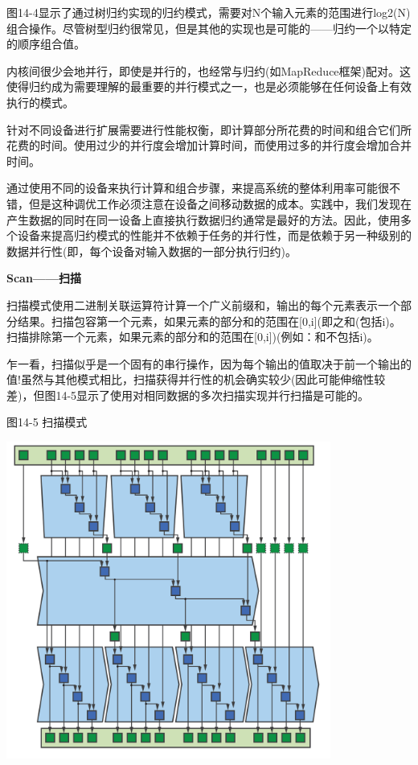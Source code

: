 图14-4显示了通过树归约实现的归约模式，需要对N个输入元素的范围进行log2(N)组合操作。尽管树型归约很常见，但是其他的实现也是可能的——归约一个以特定的顺序组合值。\par

内核间很少会地并行，即使是并行的，也经常与归约(如MapReduce框架)配对。这使得归约成为需要理解的最重要的并行模式之一，也是必须能够在任何设备上有效执行的模式。\par

针对不同设备进行扩展需要进行性能权衡，即计算部分所花费的时间和组合它们所花费的时间。使用过少的并行度会增加计算时间，而使用过多的并行度会增加合并时间。\par

通过使用不同的设备来执行计算和组合步骤，来提高系统的整体利用率可能很不错，但是这种调优工作必须注意在设备之间移动数据的成本。实践中，我们发现在产生数据的同时在同一设备上直接执行数据归约通常是最好的方法。因此，使用多个设备来提高归约模式的性能并不依赖于任务的并行性，而是依赖于另一种级别的数据并行性(即，每个设备对输入数据的一部分执行归约)。\par

\hspace*{\fill} \par %
\textbf{Scan——扫描}

扫描模式使用二进制关联运算符计算一个广义前缀和，输出的每个元素表示一个部分结果。扫描包容第一个元素，如果元素的部分和的范围在[0,i](即之和(包括i)。扫描排除第一个元素，如果元素的部分和的范围在[0,i])(例如：和不包括i)。\par

乍一看，扫描似乎是一个固有的串行操作，因为每个输出的值取决于前一个输出的值!虽然与其他模式相比，扫描获得并行性的机会确实较少(因此可能伸缩性较差)，但图14-5显示了使用对相同数据的多次扫描实现并行扫描是可能的。\par

\hspace*{\fill} \par %
图14-5 扫描模式
\begin{center}
	\includegraphics[width=0.8\textwidth]{content/chapter-14/images/5}
\end{center}

